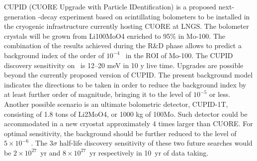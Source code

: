 CUPID (CUORE Upgrade with Particle IDentification) is a proposed next-generation \bbonu-decay experiment based on scintillating bolometers to be installed in the cryogenic infrastructure currently hosting CUORE at LNGS. The bolometer crystals will be grown from Li100MoO4 enriched to 95\% in Mo-100. The combination of the results achieved during the R\&D phase allows to predict a background index of the order of $10^{-4}$ \ckky\ in the ROI of Mo-100. The CUPID discovery sensitivity on \mbb\ is 12--20 meV in 10 y live time.
Upgrades are possible beyond the currently proposed version of CUPID. The present background model indicates the directions to be taken in order to reduce the background index by at least further order of magnitude, bringing it to the level of $10^{-5}$ \ckky or less. Another possible scenario is an ultimate bolometric detector, CUPID-1T, consisting of 1.8 tons of Li2MoO4, or 1000 kg of 100Mo. Such detector could be accommodated in a new cryostat approximately 4 times larger than CUORE. For optimal sensitivity, the background should be further reduced to the level of $5\times10^{-6}$ \ckky. The 3$\sigma$ half-life discovery sensitivity of these two future searches would be $2\times10^{27}$~yr and $8\times10^{27}$~yr respectively in 10~yr of data taking.